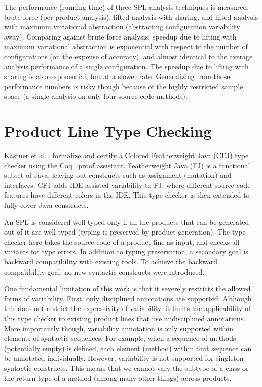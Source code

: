 \documentclass[11pt]{article}
\begin{document}
The performance (running time) of three SPL analysis techniques is measured: brute force (per product analysis), lifted analysis with sharing, and lifted analysis with maximum variational abstraction (abstracting configuration variability away). Comparing against brute force analysis, speedup due to lifting with maximum variational abstraction is exponential with respect to the number of configurations (on the expense of accuracy), and almost identical to the average analysis performance of a single configuration. The speedup due to lifting with sharing is also exponential, but at a slower rate. Generalizing from those performance numbers is risky though because of the highly restricted sample space (a single analysis on only four source code methods).

\section{Product Line Type Checking}

K\"{a}stner et al.~\cite{Kastner:2012} formalize and certify a Colored Featherweight Java (CFJ) type checker using the Coq~\cite{Bertot:2010} proof assistant. Featherweight Java (FJ) is a functional subset of Java, leaving out constructs such as assignment (mutation) and interfaces. CFJ adds IDE-assisted variability to FJ, where different source code features have different colors in the IDE. This type checker is then extended to fully cover Java constructs.

An SPL is considered well-typed only if all the products that can be generated out of it are well-typed (typing is preserved by product generation). The type checker here takes the source code of a product line as input, and checks all variants for type errors. In addition to typing preservation, a secondary goal is backward compatibility with existing tools. To achieve the backward compatibility goal, no new syntactic constructs were introduced.

One fundamental limitation of this work is that it severely restricts the allowed forms of variability. First, only disciplined annotations are supported. Although this does not restrict the expressivity of variability, it limits the applicability of this type checker to existing product lines that use undisciplined annotations. More importantly though, variability annotation is only supported within elements of syntactic sequences. For example, when a sequence of methods (potentially empty) is defined, each element (method) within that sequence can be annotated individually. However, variability is not supported for singleton syntactic constructs. This means that we cannot vary the subtype of a class or the return type of a method (among many other things) across products.
\end{document}
